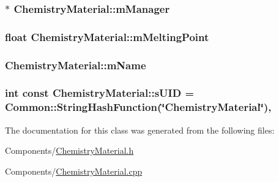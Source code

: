 \subsubsection[{\texorpdfstring{m\+Manager}{mManager}}]{$\ast$ Chemistry\+Material\+::m\+Manager\hspace{0.3cm}{\ttfamily [private]}}\hypertarget{classChemistryMaterial_afebb0a227f7f72dcb3e7dc063f31a59d}{}\label{classChemistryMaterial_afebb0a227f7f72dcb3e7dc063f31a59d}
\subsubsection[{\texorpdfstring{m\+Melting\+Point}{mMeltingPoint}}]{\setlength{\rightskip}{0pt plus 5cm}float Chemistry\+Material\+::m\+Melting\+Point\hspace{0.3cm}{\ttfamily [private]}}\hypertarget{classChemistryMaterial_aed7be13b668ef2b28f953e6d1db7a514}{}\label{classChemistryMaterial_aed7be13b668ef2b28f953e6d1db7a514}
\subsubsection[{\texorpdfstring{m\+Name}{mName}}]{ Chemistry\+Material\+::m\+Name\hspace{0.3cm}{\ttfamily [private]}}\hypertarget{classChemistryMaterial_adf9b0dde3f152ce1b811f0ceaa1e4c2b}{}\label{classChemistryMaterial_adf9b0dde3f152ce1b811f0ceaa1e4c2b}
\subsubsection[{\texorpdfstring{s\+U\+ID}{sUID}}]{\setlength{\rightskip}{0pt plus 5cm}int const Chemistry\+Material\+::s\+U\+ID = {\bf Common\+::\+String\+Hash\+Function}(\char`\"{}Chemistry\+Material\char`\"{})\hspace{0.3cm}{\ttfamily [static]}, {\ttfamily [private]}}\hypertarget{classChemistryMaterial_a4813b379e8e51e9e7ac2c23363ac32f4}{}\label{classChemistryMaterial_a4813b379e8e51e9e7ac2c23363ac32f4}


The documentation for this class was generated from the following files\+:\begin{DoxyCompactItemize}
\item 
Components/\hyperlink{ChemistryMaterial_8h}{Chemistry\+Material.\+h}\item 
Components/\hyperlink{ChemistryMaterial_8cpp}{Chemistry\+Material.\+cpp}\end{DoxyCompactItemize}
